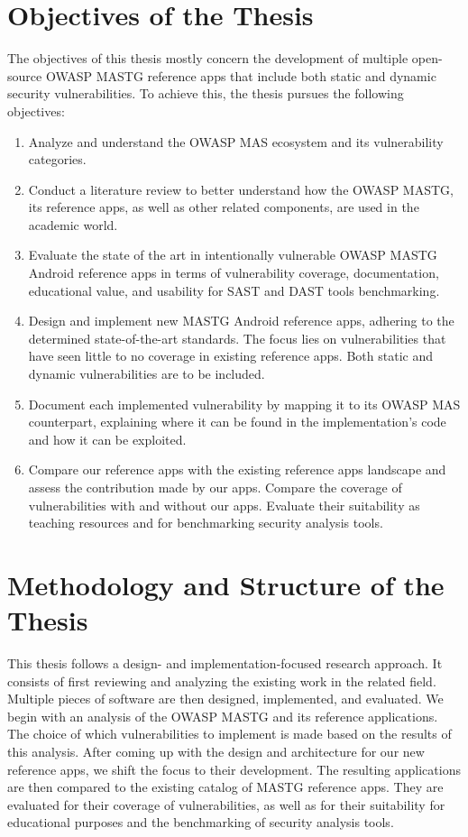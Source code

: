 \section{Objectives of the Thesis}
The objectives of this thesis mostly concern the development of multiple open-source OWASP MASTG reference apps that include both static and dynamic security vulnerabilities. To achieve this, the thesis pursues the following objectives:

\begin{enumerate}
    \item Analyze and understand the OWASP MAS ecosystem and its vulnerability categories.
    \item Conduct a literature review to better understand how the OWASP MASTG, its reference apps, as well as other related components, are used in the academic world.
    \item Evaluate the state of the art in intentionally vulnerable OWASP MASTG Android reference apps in terms of vulnerability coverage, documentation, educational value, and usability for SAST and DAST tools benchmarking.
    \item Design and implement new MASTG Android reference apps, adhering to the determined state-of-the-art standards. The focus lies on vulnerabilities that have seen little to no coverage in existing reference apps. Both static and dynamic vulnerabilities are to be included. 
    \item Document each implemented vulnerability by mapping it to its OWASP MAS counterpart, explaining where it can be found in the implementation's code and how it can be exploited.
    \item Compare our reference apps with the existing reference apps landscape and assess the contribution made by our apps. Compare the coverage of vulnerabilities with and without our apps. Evaluate their suitability as teaching resources and for benchmarking security analysis tools.
\end{enumerate}

\section{Methodology and Structure of the Thesis}

This thesis follows a design- and implementation-focused research approach. It consists of first reviewing and analyzing the existing work in the related field. Multiple pieces of software are then designed, implemented, and evaluated. We begin with an analysis of the OWASP MASTG and its reference applications. The choice of which vulnerabilities to implement is made based on the results of this analysis. After coming up with the design and architecture for our new reference apps, we shift the focus to their development. The resulting applications are then compared to the existing catalog of MASTG reference apps. They are evaluated for their coverage of vulnerabilities, as well as for their suitability for educational purposes and the benchmarking of security analysis tools.

